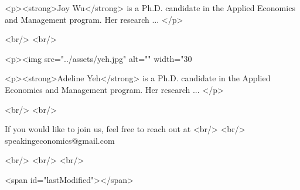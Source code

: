 <p><strong>Joy Wu</strong> is a Ph.D. candidate in the Applied Economics and Management program. Her research ... </p>

<br/>
<br/>

<p><img src="../assets/yeh.jpg" alt="" width="30%

<p><strong>Adeline Yeh</strong> is a Ph.D. candidate in the Applied Economics and Management program. Her research ... </p>


<br/>
<br/>

    
    If you would like to join us, feel free to reach out at
    <br/>
    <br/>
    speakingeconomics@gmail.com

 

<br/>
<br/>
<br/>

     
  <span id="lastModified"></span>
